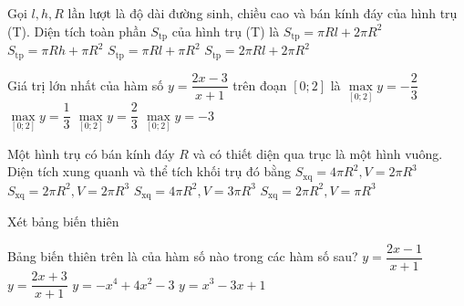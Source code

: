 \begin{ex}%
Gọi $l,h,R$ lần lượt là độ dài đường sinh, chiều cao và bán kính đáy của hình trụ (T). Diện tích toàn phần $S_{\text{tp}}$ của hình trụ (T) là
\choice
{$S_{\text{tp}}=\pi Rl+2\pi R^2$}
{$S_{\text{tp}}=\pi Rh+\pi R^2$}
{$S_{\text{tp}}=\pi Rl+\pi R^2$}
{\True $S_{\text{tp}}=2\pi Rl+2\pi R^2$}
\end{ex}

\begin{ex}%
Giá trị lớn nhất của hàm số $y=\dfrac{2x-3}{x+1}$ trên đoạn $[0;2]$ là
\choice
{$\max\limits_{[0;2]}y=-\dfrac{2}{3}$}
{\True $\max\limits_{[0;2]}y=\dfrac{1}{3}$}
{$\max\limits_{[0;2]}y=\dfrac{2}{3}$}
{$\max\limits_{[0;2]}y=-3$}
\end{ex}

\begin{ex}%
Một hình trụ có bán kính đáy $R$ và có thiết diện qua trục là một hình vuông. Diện tích xung quanh và thể tích khối trụ đó bằng
\choice
{\True $S_{\text{xq}}=4\pi R^2, V=2\pi R^3$}
{$S_{\text{xq}}=2\pi R^2, V=2\pi R^3$}
{$S_{\text{xq}}=4\pi R^2, V=3\pi R^3$}
{$S_{\text{xq}}=2\pi R^2, V=\pi R^3$}
\end{ex}

\begin{ex}%
Xét bảng biến thiên 
\begin{center}
\end{center}
Bảng biến thiên trên là của hàm số nào trong các hàm số sau?
\choice
{$y=\dfrac{2x-1}{x+1}$}
{\True $y=\dfrac{2x+3}{x+1}$}
{$y=-x^4+4x^2-3$}
{$y=x^3-3x+1$}
\end{ex}

